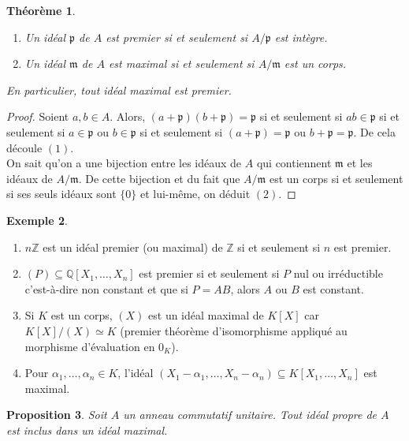 \documentclass{article}
\newcommand{\Z}{\mathbb{Z}}
\newcommand{\Q}{\mathbb{Q}}
\newcommand{\prem}{\mathfrak{p}}
\newcommand{\maxid}{\mathfrak{m}}
\theoremstyle{plain}
\newtheorem{theorem}{Théorème}[section]
\newtheorem{proposition}[theorem]{Proposition}
\theoremstyle{definition}
\newtheorem{example}[theorem]{Exemple}
\theoremstyle{remark}
\begin{document}
\begin{theorem} \leavevmode
    \begin{enumerate}
        \item Un idéal $\prem$ de $A$ est premier si et seulement si $A/\prem$ est intègre.
        \item Un idéal $\maxid$ de $A$ est maximal si et seulement si $A/\maxid$ est un corps.
    \end{enumerate}
    En particulier, tout idéal maximal est premier.
\end{theorem}

\begin{proof}
    Soient $a,b \in A$. Alors, $(a+\prem)(b+\prem) = \prem$ si et seulement si $ab \in \prem$ si et seulement si $a \in \prem$ ou $b \in \prem$ si et seulement si $(a+\prem) = \prem$ ou $b +\prem = \prem$. De cela découle $(1)$.\\
    On sait qu'on a une bijection entre les idéaux de $A$ qui contiennent $\maxid$ et les idéaux de $A/\maxid$. De cette bijection et du fait que $A/\maxid$ est un corps si et seulement si ses seuls idéaux sont $\{0\}$ et lui-même, on déduit $(2)$.
\end{proof}

\begin{example} \leavevmode
    \begin{enumerate}
        \item $n\Z$ est un idéal premier (ou maximal) de $\Z$ si et seulement si $n$ est premier.
        \item $(P) \subseteq \Q[X_1,\dots,X_n]$ est premier si et seulement si $P$ nul ou irréductible c'est-à-dire non constant et que si $P=AB$, alors $A$ ou $B$ est constant.
        \item Si $K$ est un corps, $(X)$ est un idéal maximal de $K[X]$ car $K[X]/(X) \simeq K$ (premier théorème d'isomorphisme appliqué au morphisme d'évaluation en $0_K$).
        \item Pour $\alpha_1,\dots,\alpha_n \in K$, l'idéal $(X_1-\alpha_1,\dots,X_n-\alpha_n) \subseteq K[X_1,\dots,X_n]$ est maximal.
    \end{enumerate}
\end{example}

\begin{proposition}
    Soit $A$ un anneau commutatif unitaire. Tout idéal propre de $A$ est inclus dans un idéal maximal.
\end{proposition}
\end{document}
